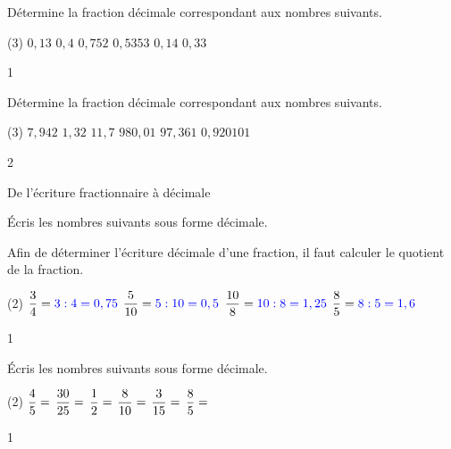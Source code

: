 \documentclass[a4paper,11pt]{report}
\begin{document}
\vfill

\newpage

\begin{exo}{
	Détermine la fraction décimale correspondant aux nombres suivants.
	\begin{tasks}[after-item-skip=0.2em, after-skip=-0.5em](3)
		\task $0,13$
		\task $0,4$
		\task $0,752$
		\task $0,5353$
		\task $0,14$
		\task $0,33$
	\end{tasks}
 \vspace{1pt}
}{1}\end{exo}


\begin{exo}{
	Détermine la fraction décimale correspondant aux nombres suivants.
	\begin{tasks}[after-item-skip=0.2em](3)
		\task $7,942$
		\task $1,32$
		\task $11,7$
		\task $980,01$
		\task $97,361$
		\task $0,920101$
	\end{tasks}
 \vspace{1pt}
}{2}\end{exo}

\begin{resolu}{De l'écriture fractionnaire à décimale}
{Écris les nombres suivants sous forme décimale.

{\color{blue} Afin de déterminer l'écriture décimale d'une fraction, il faut calculer le quotient de la fraction.}

\begin{tasks}(2)
    \task $\dfrac{3}{4}={{\color{blue}3\div 4=0,75}}$
    \task $\dfrac{5}{10}={{\color{blue}5\div 10=0,5}}$
    \task $\dfrac{10}{8}={{\color{blue}10\div 8=1,25}}$
    \task $\dfrac{8}{5}={{\color{blue}8\div 5=1,6}}$
\end{tasks}
 \vspace{1pt}
}{1}
\end{resolu}

\begin{exop}{
Écris les nombres suivants sous forme décimale.
\begin{tasks}(2)
	\task $\dfrac{4}{5}=\hrulefill$\hspace{0.5cm}
    \task $\dfrac{30}{25}=\hrulefill$
    \task $\dfrac{1}{2}=\hrulefill$\hspace{0.5cm}
    \task $\dfrac{8}{10}=\hrulefill$
    \task $\dfrac{3}{15}=\hrulefill$\hspace{0.5cm}
    \task $\dfrac{8}{5}=\hrulefill$
\end{tasks}
 \vspace{1pt}

}{1}\end{exop}
\end{document}
